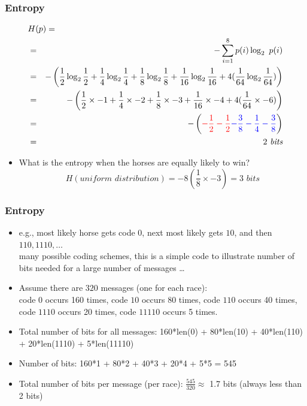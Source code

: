 \documentclass[handout]{beamer}
\begin{document}
\begin{frame}
\frametitle{Entropy}
\begin{eqnarray*}
\lefteqn{ H(p) = } \nonumber \\
&=& - \sum^{8}_{i=1} p(i) \log_2\ p(i) \nonumber \\
&=& - \left( \frac{1}{2} \log_2 \frac{1}{2} + \frac{1}{4} \log_2 \frac{1}{4} +
\frac{1}{8} \log_2 \frac{1}{8} + \frac{1}{16} \log_2 \frac{1}{16} +
4 (\frac{1}{64} \log_2 \frac{1}{64}) \right) \nonumber \\
&=& - \left( \frac{1}{2} \times -1 + \frac{1}{4} \times -2 +
\frac{1}{8} \times -3 + \frac{1}{16} \times -4 +
4 (\frac{1}{64} \times -6 ) \right) \nonumber \\
&=& - \left( {\color{red}-\frac{1}{2} - \frac{1}{2}} {\color{blue} - \frac{3}{8} - \frac{1}{4} - \frac{3}{8}} \right) \nonumber \\
&=& 2\ \textit{bits}
\end{eqnarray*}

\begin{itemize}[<+->]
\item What is the entropy when the horses are equally likely to win?
\[ H(\textit{uniform distribution}) = - 8 (\frac{1}{8} \times -3) = 3 \textit{ bits} \]
\end{itemize}

\end{frame}

\begin{frame}
\frametitle{Entropy}
\begin{itemize}[<+->]
\item e.g., most likely horse gets code $0$, next most likely gets $10$, and then $110, 1110, \ldots$ \\ {\small many possible coding schemes, this is a simple code to illustrate number of bits needed for a large number of messages \ldots}
\item Assume there are $320$ messages (one for each race): \\
code $0$ occurs 160 times, code $10$ occurs 80 times, code $110$ occurs 40 times, code $1110$ occurs 20 times, code $11110$ occurs 5 times.
\item Total number of bits for all messages: 160*len(0) + 80*len(10) + 40*len(110) + 20*len(1110) + 5*len(11110) 
\item Number of bits: 160*1 + 80*2 + 40*3 + 20*4 + 5*5 = 545
\item Total number of bits per message (per race): $\frac{545}{320} \approx$ 1.7 bits (always less than 2 bits)
\end{itemize}

\end{frame}
\end{document}
